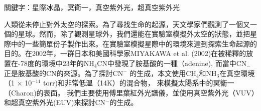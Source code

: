 \begin{abstractcn}

關鍵字：星際冰晶，冥衛一，真空紫外光，超真空紫外光
\vspace{2em}

人類從未停止對外太空的探索。為了尋找生命的起源，天文學家們觀測了一個又一個的星球。然而，除了觀測星球外，我們還能在實驗室模擬外太空的狀態，並把星際中的一些簡單份子製作出來。在實驗室模擬星際中的環境來達到探索生命起源的目的。在2002年，一群日本和美國科學家MIYAKAWA et al. (2002)\cite{miyakawa2002cold}在被稀釋的放置在-78度的環境中23年的NH$_4$CN中發現了胺基酸的一種（adenine), 而當中CN$_-$正是胺基酸的CN的來源。為了探討CN$^-$ 的生成，本文使用CH$_4$和NH$_3$在真空環境（1 $\times$ 10$^{-11}$ torr)和非常低溫（14K）的混合物， 來模擬太陽系中的冥衛一（Charon)的表面。 我們主要使用傅里葉紅外光譜儀，並使用真空紫外光（VUV）和超真空紫外光(EUV)來探討CN$^-$的生成。

\end{abstractcn} 
